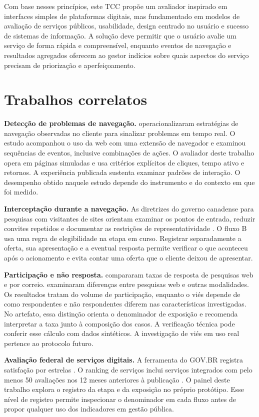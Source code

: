Com base nesses princípios, este TCC propõe um avaliador inspirado em interfaces simples de plataformas digitais, mas fundamentado em modelos de avaliação de serviços públicos, usabilidade, design centrado no usuário e sucesso de sistemas de informação. A solução deve permitir que o usuário avalie um serviço de forma rápida e compreensível, enquanto eventos de navegação e resultados agregados oferecem ao gestor indícios sobre quais aspectos do serviço precisam de priorização e aperfeiçoamento.

\section{Trabalhos correlatos}
\label{sec:2.12}

\textbf{Detecção de problemas de navegação.}  operacionalizaram estratégias de navegação observadas no cliente para sinalizar problemas em tempo real. O estudo acompanhou o uso da web com uma extensão de navegador e examinou sequências de eventos, inclusive combinações de ações. O avaliador deste trabalho opera em páginas simuladas e usa critérios explícitos de cliques, tempo ativo e retornos. A experiência publicada sustenta examinar padrões de interação. O desempenho obtido naquele estudo depende do instrumento e do contexto em que foi medido.

\textbf{Interceptação durante a navegação.} As diretrizes do governo canadense para pesquisas com visitantes de sites orientam examinar os pontos de entrada, reduzir convites repetidos e documentar as restrições de representatividade \cite{canada2008}. O fluxo B usa uma regra de elegibilidade na etapa em curso. Registrar separadamente a oferta, sua apresentação e a eventual resposta permite verificar o que aconteceu após o acionamento e evita contar uma oferta que o cliente deixou de apresentar.

\textbf{Participação e não resposta.}  compararam taxas de resposta de pesquisas web e por correio.  examinaram diferenças entre pesquisas web e outras modalidades. Os resultados tratam do volume de participação, enquanto o viés depende de como respondentes e não respondentes diferem nas características investigadas. No artefato, essa distinção orienta o denominador de exposição e recomenda interpretar a taxa junto à composição dos casos. A verificação técnica pode conferir esse cálculo com dados sintéticos. A investigação de viés em uso real pertence ao protocolo futuro.

\textbf{Avaliação federal de serviços digitais.} A ferramenta do GOV.BR registra satisfação por estrelas \cite{brasil2026}. O ranking de serviços inclui serviços integrados com pelo menos 50 avaliações nos 12 meses anteriores à publicação \cite{brasilRanking}. O painel deste trabalho explora o registro da etapa e da exposição no próprio protótipo. Esse nível de registro permite inspecionar o denominador em cada fluxo antes de propor qualquer uso dos indicadores em gestão pública.
